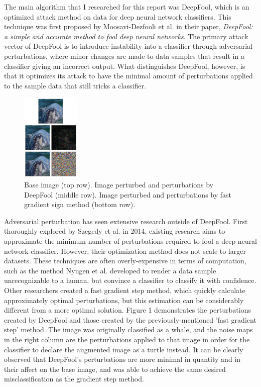 \documentclass[../article.tex]{subfiles}
\begin{document}
The main algorithm that I researched for this report was DeepFool, which is an optimized attack method on data for deep neural network classifiers. This technique was first proposed by Moosavi-Dezfooli et al. in their paper, \emph{DeepFool: a simple and accurate method to fool deep neural networks}. The primary attack vector of DeepFool is to introduce instability into a classifier through adversarial perturbations, where minor changes are made to data samples that result in a classifier giving an incorrect output. What distinguishes DeepFool, however, is that it optimizes its attack to have the minimal amount of perturbations applied to the sample data that still tricks a classifier.

\begin{figure} %
	\centering
	\includegraphics[width=0.25\textwidth]{adv_pert_img.png}
	\caption{\label{fig:Figure 1}Base image (top row). Image perturbed and perturbations by DeepFool (middle row). Image perturbed and perturbations by fast gradient sign method (bottom row).}
\end{figure}

Adversarial perturbation has seen extensive research outside of DeepFool. First thoroughly explored by Szegedy et al. in 2014, existing research aims to approximate the minimum number of perturbations required to fool a deep neural network classifier. However, their optimization method does not scale to larger datasets. These techniques are often overly-expensive in terms of computation, such as the method Nyugen et al. developed to render a data sample unrecognizable to a human, but convince a classifier to classify it with confidence. Other researchers created a fast gradient step method, which quickly calculate approximately optimal perturbations, but this estimation can be considerably different from a more optimal solution. Figure 1 demonstrates the perturbations created by DeepFool and those created by the previously-mentioned 'fast gradient step' method. The image was originally classified as a whale, and the noise maps in the right column are the perturbations applied to that image in order for the classifier to declare the augmented image as a turtle instead. It can be clearly observed that DeepFool's perturbations are more minimal in quantity and in their affect on the base image, and was able to achieve the same desired misclassification as the gradient step method.
\end{document}
